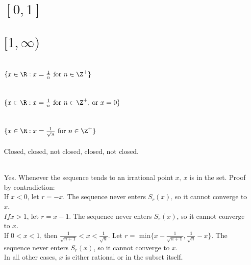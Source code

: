 
\begin{parts}
 
 \part{$[0,1]$}
 \part{$[1,\infty)$}
 \part{$\{x\in\R:x=\frac{1}{n} \text{ for }n \in \Z^+\}$}
  \part{$\{x\in\R:x=\frac{1}{n} \text{ for }n \in \Z^+\text{, or }x=0\}$}
  \part{$\{x\in\R:x=\frac{1}{\sqrt{n}} \text{ for } n \in \Z^+\}$}
  
\end{parts}

\begin{solution}
 Closed, closed, not closed, closed, not closed.
\end{solution}


\begin{solution}
 \\Yes. Whenever the sequence tends to an irrational point $x$, $x$ is in the set. Proof by contradiction: \\
 If $x < 0$, let $r = -x$. The sequence never enters $S_r(x)$, so it cannot converge to $x$. \\
 $If x > 1$, let $r = x-1$. The sequence never enters $S_r(x)$, so it cannot converge to $x$. \\
If $0<x<1$, then $\frac{1}{\sqrt{n+1}} < x < \frac{1}{\sqrt{n}}$. Let $r = \text{ min} \{x-\frac{1}{\sqrt{n+1}}, \frac{1}{\sqrt{n}}-x\}$. The sequence never enters $S_r(x)$, so it cannot converge to $x$. \\
In all other cases, $x$ is either rational or in the subset itself.
\end{solution}

